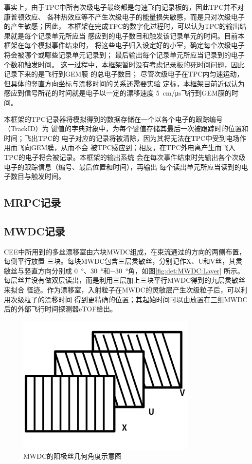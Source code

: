 \documentclass[bachelor,openany,oneside,color]{buaathesis}
\begin{document}
事实上，由于TPC中所有次级电子最终都是匀速飞向记录板的，因此TPC并不对康普顿效应、
各种热效应等不产生次级电子的能量损失敏感，而是只对次级电子的产生敏感；因此，
本框架在完成TPC的数字化过程时，可以认为TPC的输出结果就是每个记录单元所应当
感应到的电子数目和触发该记录单元的时间。目前本框架在每个模拟事件结束时，
将这些电子归入设定好的小室，确定每个次级电子将会被哪个或哪些记录单元记录到；
最后输出每个记录单元所应当记录到的电子个数和触发时间。
这一过程中，本框架暂时没有考虑记录板的死时间问题，因此记录下来的是飞行到GEM膜
的总电子数目；
尽管次级电子在TPC内匀速运动，但具体的竖直方向坐标与漂移时间的关系还需要实验
定标，本框架目前近似认为感应到信号所花的时间就是电子以一定的漂移速度
\SI{5}{\centi\meter/\micro\second}飞行到GEM膜的时间。

本框架的TPC记录器将模拟得到的数据存储在一个以各个电子的跟踪编号（TrackID）为
键值的字典对象中，为每个键值存储其最后一次被跟踪时的位置和时间；飞出TPC的
电子对应的记录将被清除，因为其将无法在TPC中受到电场作用而飞向GEM膜，从而不会
被TPC感应到；相反，在TPC外电离产生而飞入TPC的电子将会被记录。本框架的输出系统
会在每次事件结束时先输出各个次级电子的跟踪信息（编号、最后位置和时间），再输出
每个读出单元所应当读到的电子数目与触发时间。

\subsection{MRPC记录}\label{ssec:digi:MRPC}



\subsection{MWDC记录}\label{ssec:digi:MWDC}

CEE中所用到的多丝漂移室由六块MWDC组成，在束流通过的方向的两侧布置，每侧平行放置
三块。每块MWDC包含三层灵敏丝，分别记作X、U和V丝，其灵敏丝与竖直方向分别成
\SI{0}{\degree}、\SI{30}{\degree}和\SI{-30}{\degree}角，如图\ref{fig:det:MWDC:Layer}
所示。每层丝并没有做双层读出，而是利用三层加上三块平行MWDC得到的九层灵敏丝来拟合
径迹。作为漂移室，入射粒子在MWDC的灵敏层产生次级粒子后，可以利用次级粒子的漂移时间
得到更精确的位置；其起始时间可以由放置在三组MWDC后的外部飞行时间探测器eTOF给出。

\begin{figure}
	\centering
	\includegraphics[width=0.8\textwidth]{./resource/CEE-MWDC-Layer.png}
	\caption{MWDC的阳极丝几何角度示意图}
\end{figure}
\end{document}

